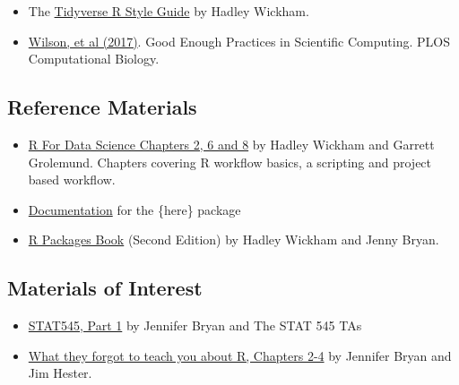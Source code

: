 \documentclass[
  letterpaper,
  DIV=11,
  numbers=noendperiod]{scrreprt}
\providecommand{\tightlist}{%
  \setlength{\itemsep}{0pt}\setlength{\parskip}{0pt}}\usepackage{longtable,booktabs,array}
\begin{document}
\begin{itemize}
\tightlist
\item
  The \href{https://style.tidyverse.org/}{Tidyverse R Style Guide} by
  Hadley Wickham.
\end{itemize}

\begin{itemize}
\tightlist
\item
  \href{https://journals.plos.org/ploscompbiol/article?id=10.1371/journal.pcbi.1005510&ref=https://githubhelp.com}{Wilson,
  et al (2017)}. Good Enough Practices in Scientific Computing. PLOS
  Computational Biology.
\end{itemize}

\subsection*{Reference Materials}\label{reference-materials}

\begin{itemize}
\item
  \href{https://r4ds.had.co.nz/index.html}{R For Data Science Chapters
  2, 6 and 8} by Hadley Wickham and Garrett Grolemund. Chapters covering
  R workflow basics, a scripting and project based workflow.
\item
  \href{https://here.r-lib.org/articles/here.html}{Documentation} for
  the \{here\} package
\item
  \href{https://r-pkgs.org/}{R Packages Book} (Second Edition) by Hadley
  Wickham and Jenny Bryan.
\end{itemize}

\subsection*{Materials of Interest}\label{materials-of-interest}

\begin{itemize}
\tightlist
\item
  \href{https://stat545.com/index.html}{STAT545, Part 1} by Jennifer
  Bryan and The STAT 545 TAs
\end{itemize}

\begin{itemize}
\tightlist
\item
  \href{https://rstats.wtf/}{What they forgot to teach you about R,
  Chapters 2-4} by Jennifer Bryan and Jim Hester.
\end{itemize}
\end{document}
